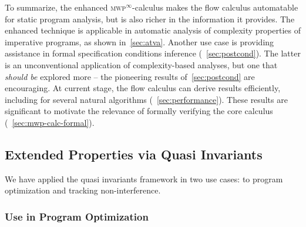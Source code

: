 To summarize, the enhanced \textsc{mwp}\(^\infty\)-calculus makes the flow calculus automatable for static program analysis,
but is also richer in the information it provides.
The enhanced technique is applicable in automatic analysis of complexity properties of imperative programs, as shown in~\autoref{sec:atva}.
Another use case is providing assistance in formal specification conditions inference (\cf~\autoref{sec:postcond}).
The latter is an unconventional application of complexity-based analyses, but one that \emph{should be} explored more --
the pioneering results of~\autoref{sec:postcond} are encouraging.
At current stage, the flow calculus can derive results efficiently, including for several natural algorithms (\cf~\autoref{sec:performance}).
These results are significant to motivate the relevance of formally verifying the core calculus (\cf~\autoref{sec:mwp-calc-formal}).


\subsection{Extended Properties via Quasi Invariants}
\label{subsec:res-qi}

We have applied the quasi invariants framework in two use cases: to program optimization and tracking non-interference.

\subsubsection{Use in Program Optimization}
\label{subsubsec:qi-opt}

